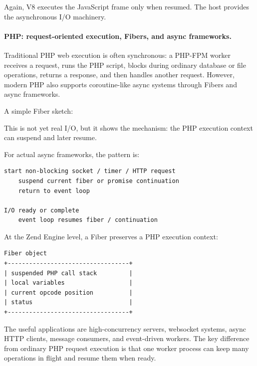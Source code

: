 Again, V8 executes the JavaScript frame only when resumed. The host provides the asynchronous I/O machinery.

\paragraph{PHP: request-oriented execution, Fibers, and async frameworks.}

Traditional PHP web execution is often synchronous: a PHP-FPM worker receives a request, runs the PHP script, blocks during ordinary database or file operations, returns a response, and then handles another request. However, modern PHP also supports coroutine-like async systems through Fibers and async frameworks.

A simple Fiber sketch:



This is not yet real I/O, but it shows the mechanism: the PHP execution context can suspend and later resume.

For actual async frameworks, the pattern is:

\begin{verbatim}
start non-blocking socket / timer / HTTP request
    suspend current fiber or promise continuation
    return to event loop

I/O ready or complete
    event loop resumes fiber / continuation
\end{verbatim}

At the Zend Engine level, a Fiber preserves a PHP execution context:

\begin{verbatim}
Fiber object
+----------------------------------+
| suspended PHP call stack         |
| local variables                  |
| current opcode position          |
| status                           |
+----------------------------------+
\end{verbatim}

The useful applications are high-concurrency servers, websocket systems, async HTTP clients, message consumers, and event-driven workers. The key difference from ordinary PHP request execution is that one worker process can keep many operations in flight and resume them when ready.

